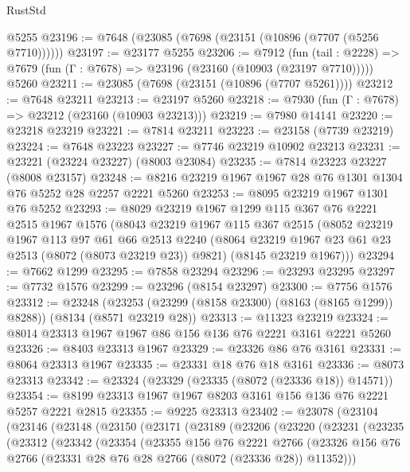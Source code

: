 \begin{lexlean}{RustStd}
\begin{coremodule}
{\begin{coremodule}
{{{{{{{{{{{{{{{{{{{{{{{{{{{{{{{{{{{{{{{{{{{{{{{{{{{{{    @5255
@23196 := @7648 (@23085 (@7698 (@23151 (@10896 (@7707 (@5256 @7710))))))
@23197 := @23177 @5255
@23206 := @7912
    (fun (tail : @2228) => @7679 (fun (Γ : @7678) => @23196 (@23160 (@10903 (@23197 @7710)))))
    @5260
@23211 := @23085 (@7698 (@23151 (@10896 (@7707 @5261))))
@23212 := @7648 @23211
@23213 := @23197 @5260
@23218 := @7930 (fun (Γ : @7678) => @23212 (@23160 (@10903 @23213)))
@23219 := @7980 @14141
@23220 := @23218 @23219
@23221 := @7814 @23211
@23223 := @23158 (@7739 @23219)
@23224 := @7648 @23223
@23227 := @7746 @23219 @10902 @23213
@23231 := @23221 (@23224 @23227) (@8003 @23084)
@23235 := @7814 @23223 @23227 (@8008 @23157)
@23248 := @8216 @23219 @1967 @1967 @28 @76 @1301 @1304 @76 @5252 @28 @2257 @2221 @5260
@23253 := @8095 @23219 @1967 @1301 @76 @5252
@23293 := @8029
    @23219
    @1967
    @1299
    @115
    @367
    @76
    @2221
    @2515
    @1967
    @1576
    (@8043
      @23219
      @1967
      @115
      @367
      @2515
      (@8052
        @23219
        @1967
        @113
        @97
        @61
        @66
        @2513
        @2240
        (@8064 @23219 @1967 @23 @61 @23 @2513 (@8072 (@8073 @23219 @23)) @9821)
        (@8145 @23219 @1967)))
@23294 := @7662 @1299
@23295 := @7858 @23294
@23296 := @23293 @23295
@23297 := @7732 @1576
@23299 := @23296 (@8154 @23297)
@23300 := @7756 @1576
@23312 := @23248
    (@23253 (@23299 (@8158 @23300) (@8163 (@8165 @1299)) @8288))
    (@8134 (@8571 @23219 @28))
@23313 := @11323 @23219
@23324 := @8014 @23313 @1967 @1967 @86 @156 @136 @76 @2221 @3161 @2221 @5260
@23326 := @8403 @23313 @1967
@23329 := @23326 @86 @76 @3161
@23331 := @8064 @23313 @1967
@23335 := @23331 @18 @76 @18 @3161
@23336 := @8073 @23313
@23342 := @23324 (@23329 (@23335 (@8072 (@23336 @18)) @14571))
@23354 := @8199 @23313 @1967 @1967 @8203 @3161 @156 @136 @76 @2221 @5257 @2221 @2815
@23355 := @9225 @23313
@23402 := @23078
    (@23104
      (@23146
        (@23148
          (@23150
            (@23171
              (@23189
                (@23206
                  (@23220
                    (@23231
                      (@23235
                        (@23312
                          (@23342
                            (@23354
                              (@23355
                                @156
                                @76
                                @2221
                                @2766
                                (@23326
                                  @156
                                  @76
                                  @2766
                                  (@23331 @28 @76 @28 @2766 (@8072 (@23336 @28)) @11352)))
}}}}}}}}}}}}}}}}}}}}}}}}}}}}}}}}}}}}}}}}}}}}}}}}}}}}}
\end{coremodule}}
\end{coremodule}
\end{lexlean}
